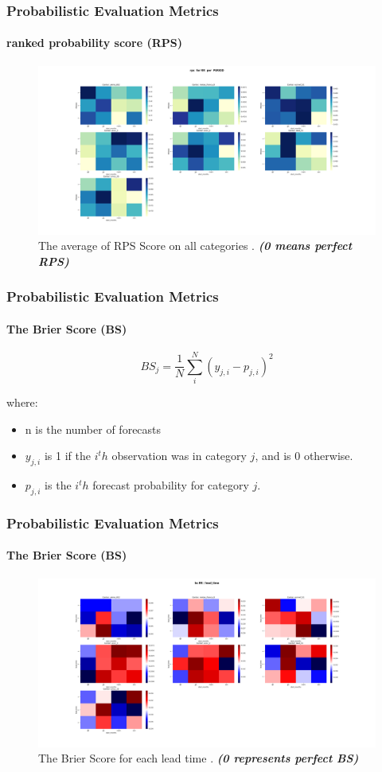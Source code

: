 \begin{frame}
\frametitle{Probabilistic Evaluation Metrics}
\framesubtitle{ranked probability score (RPS)}
\begin{figure}[H]
    \centering
    \includegraphics[scale=0.15]{rps_RR_ PERIOD.png}
    \caption{The average of  RPS Score on all categories    . \textbf{\textit{(0 means perfect RPS)}}}
\end{figure}
\end{frame}


\begin{frame}
\frametitle{Probabilistic Evaluation Metrics}
\framesubtitle{The Brier Score (BS)}

$$BS_j=\frac{1}{N} \sum\limits_{i}^{N} (y_{j,i} - p_{j,i})^2$$

where:
\begin{itemize}
	\item n is the number of forecasts
	\item $y_{j,i} $ is 1 if the $i^th$ observation was in category $j$, and is 0 otherwise.
	\item $p_{j,i}$  is the $i^th$ forecast probability for category $j$.
\end{itemize}
\end{frame}

\begin{frame}
\frametitle{Probabilistic Evaluation Metrics}
\framesubtitle{The Brier Score (BS)}
\begin{figure}[H]
    \centering
    \includegraphics[scale=0.15]{bs_RR_lead_time.png}
    \caption{The Brier Score for each lead time  . \textbf{\textit{(0 represents perfect BS)}}}
\end{figure}
\end{frame}


